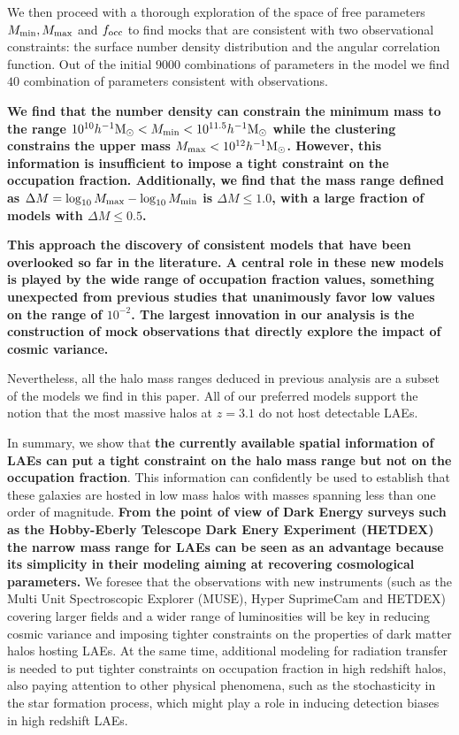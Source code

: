 \documentclass[usenatbib]{mn2e}
\newcommand{\ly}{{\ifmmode{{\rm Ly}\alpha}\else{Ly$\alpha$~}\fi}}
\newcommand{\hMsun}{{\ifmmode{h^{-1}{\rm
        {M_{\odot}}}}\else{$h^{-1}{\rm{M_{\odot}}}$}\fi}}
\begin{document}
We then proceed with a thorough exploration of the space of free
parameters $M_{\rm min}, M_{\rm max}$ and $f_{\rm occ}$ to find mocks
that are consistent with two observational constraints: the surface
number density distribution and the angular correlation function. Out
of the initial $9000$  combinations of parameters in the model we find
$40$ combination of parameters consistent with observations.

{\bf We find that the number density can constrain the minimum mass to the range
  $10^{10}\hMsun < M_{\rm min} < 10^{11.5}\hMsun$ while the clustering
  constrains the upper mass $M_{\rm    max} < 10^{12}\hMsun$. However,
  this information is insufficient to impose a tight constraint on the
  occupation fraction. Additionally, we find that the mass range defined as
$\Delta M=\log_{10}M_{\rm max} - \log_{10}M_{\rm min}$ is $\Delta
M\leq 1.0$, with a large fraction of models with $\Delta M\leq 0.5$.} 

{\bf This approach the discovery of consistent models that have
been overlooked so far in the literature. A central role in these new
models is played by the wide range of occupation fraction values,
something unexpected from previous studies \citep[i.e.][]{Gawiser2007,Ouchi2010}  that unanimously favor low values on the range of $10^{-2}$. The largest
innovation in our analysis is the construction of mock observations
that directly explore the impact of cosmic variance.}

Nevertheless, all the halo mass ranges deduced in previous analysis are a
subset of the models we find in this paper.  All of our
preferred models support the notion that the most massive halos at
$z=3.1$ do not host detectable LAEs.

In summary, we show that {\bf the currently available spatial
  information of LAEs can put a tight constraint on the halo mass
  range but not on the occupation fraction}. This information can
confidently be used to establish that these galaxies are hosted in low
mass halos with masses spanning less than one order of magnitude. {\bf
  From the point of view of Dark Energy surveys such as the Hobby-Eberly
  Telescope Dark Enery Experiment (HETDEX) the
  narrow mass range for LAEs can be seen as an advantage because its
  simplicity in their modeling aiming at recovering cosmological
  parameters.} We foresee that the observations with new instruments
(such as the Multi Unit Spectroscopic Explorer (MUSE), Hyper
SuprimeCam and HETDEX) covering larger fields and a wider range of
luminosities will be key in reducing cosmic variance and imposing
tighter constraints on the properties of dark matter halos hosting
LAEs. At the same time, additional modeling for \ly radiation transfer
is needed to put tighter constraints on  occupation fraction in high
redshift halos, also paying attention to other physical phenomena,
such as the stochasticity \citep{ForeroRomero2013} in the star
formation process, which might play a role in inducing detection
biases in high redshift LAEs.  
\end{document}
